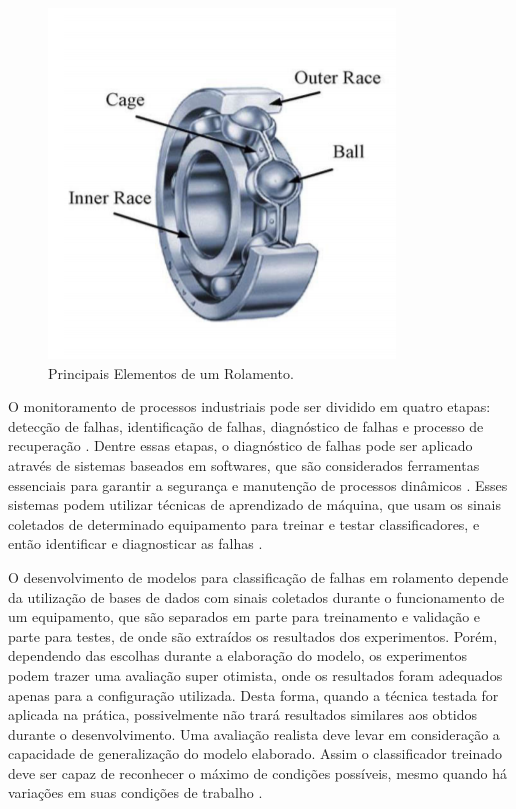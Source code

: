 \documentclass[conference]{IEEEtran}
\begin{document}
\begin{figure}[htbp]
\centerline{\includegraphics{artigo/fig1.png}}
\caption{Principais Elementos de um Rolamento.}
\label{fig1}
\end{figure}

O monitoramento de processos industriais pode ser dividido em quatro etapas: detecção de falhas, identificação de falhas, diagnóstico de falhas e processo de recuperação \cite{b3}.
Dentre essas etapas, o diagnóstico de falhas pode ser aplicado através de sistemas baseados em softwares, que são considerados ferramentas essenciais para garantir a segurança e manutenção de processos dinâmicos \cite{b3}.
Esses sistemas podem utilizar técnicas de aprendizado de máquina, que usam os sinais coletados de determinado equipamento para treinar e testar classificadores, e então identificar e diagnosticar as falhas \cite{b4}.

O desenvolvimento de modelos para classificação de falhas em rolamento depende da utilização de bases de dados com sinais coletados durante o funcionamento de um equipamento, que são separados em parte para treinamento e validação e parte para testes, de onde são extraídos os resultados dos experimentos.
Porém, dependendo das escolhas durante a elaboração do modelo, os experimentos podem trazer uma avaliação super otimista, onde os resultados foram adequados apenas para a configuração utilizada.
Desta forma, quando a técnica testada for aplicada na prática, possivelmente não trará resultados similares aos obtidos durante o desenvolvimento.
Uma avaliação realista deve levar em consideração a capacidade de generalização do modelo elaborado.
Assim o classificador treinado deve ser capaz de reconhecer o máximo de condições possíveis, mesmo quando há variações em suas condições de trabalho \cite{b4}.
\end{document}
